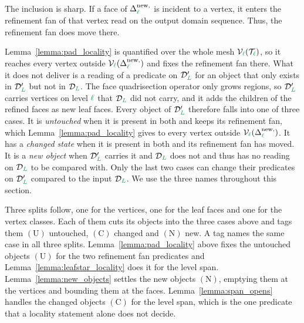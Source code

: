 \documentclass[a4paper, 12pt]{article}
\makeatletter
\newcommand{\green}{\color{ForestGreen}}
\newcommand{\T}{\mathcal{T}}
\newcommand{\V}{\mathcal{V}}
\DeclareRobustCommand{\simplexsubsetNew}[2][]{\Delta^{\mathrm{new}\ifx\@empty#1\@empty\else,#1\fi}_{#2}}
\renewcommand{\l}{{\green\ell}}
\renewcommand{\L}{{\green L}}
\theoremstyle{definition}
\theoremstyle{plain}
\numberwithin{equation}{section}
\DeclareRobustCommand{\domseq}[1][]{\mathcal{D}\ifx\@empty#1\@empty\else_{#1}\fi}
\makeatother
\begin{document}
The inclusion is sharp. If a face of $\simplexsubsetNew{\l}$ is incident to a vertex, it enters the refinement fan of that vertex read on the output domain sequence. Thus, the refinement fan does move there.

Lemma~\ref{lemma:pad_locality} is quantified over the whole mesh $\V_\l(\T_\l)$, so it reaches every vertex outside $\V_\l(\simplexsubsetNew{\l})$ and fixes the refinement fan there. What it does not deliver is a reading of a predicate on $\domseq[\L]'$ for an object that only exists in $\domseq[\L]'$ but not in $\domseq[\L]$. The face quadrisection operator only grows regions, so $\domseq[\L]'$ carries vertices on level $\l$ that $\domseq[\L]$ did not carry, and it adds the children of the refined faces as new leaf faces. Every object of $\domseq[\L]'$ therefore falls into one of three cases. It is \emph{untouched} when it is present in both and keeps its refinement fan, which Lemma~\ref{lemma:pad_locality} gives to every vertex outside $\V_\l(\simplexsubsetNew{\l})$. It has a \emph{changed state} when it is present in both and its refinement fan has moved. It is a \emph{new object} when $\domseq[\L]'$ carries it and $\domseq[\L]$ does not and thus has no reading on $\domseq[\L]$ to be compared with. Only the last two cases can change their predicates on $\domseq[\L]'$ compared to the input $\domseq[\L]$. We use the three names throughout this section.

Three splits follow, one for the vertices, one for the leaf faces and one for the vertex classes. Each of them cuts its objects into the three cases above and tags them $(\mathrm{U})$ untouched, $(\mathrm{C})$ changed and $(\mathrm{N})$ new. A tag names the same case in all three splits. Lemma~\ref{lemma:pad_locality} above fixes the untouched objects $(\mathrm{U})$ for the two refinement fan predicates and Lemma~\ref{lemma:leafstar_locality} does it for the level span. Lemma~\ref{lemma:new_objects} settles the new objects $(\mathrm{N})$, emptying them at the vertices and bounding them at the faces. Lemma~\ref{lemma:span_opens} handles the changed objects $(\mathrm{C})$ for the level span, which is the one predicate that a locality statement alone does not decide.
\end{document}
